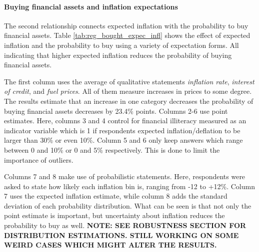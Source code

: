 \documentclass[ProjectABM]{subfiles}
\begin{document}



\paragraph{Buying financial assets and inflation expectations}
The second relationship connects expected inflation with the probability to buy financial assets. %
Table \ref{tab:reg_bought_expec_infl} shows the effect of expected inflation and the probability to buy using a variety of expectation forms. All indicating that higher expected inflation reduces the probability of buying financial assets.

The first column uses the average of qualitative statements \textit{inflation rate}, \textit{interest of credit}, and \textit{fuel prices}. All of them measure increases in prices to some degree. The results estimate that an increase in one category decreases the probability of buying financial assets decreases by 23.4\% points. Columns 2-6 use point estimates. Here, columns 3 and 4 control for financial illiteracy measured as an indicator variable which is 1 if respondents expected inflation/deflation to be larger than 30\% or even 10\%. Column 5 and 6 only keep answers which range between 0 and 10\% or 0 and 5\% respectively. This is done to limit the importance of outliers.

Columns 7 and 8 make use of probabilistic statements. Here, respondents were asked to state how likely each inflation bin is, ranging from -12 to +12\%. Column 7 uses the expected inflation estimate, while column 8 adds the standard deviation of each probability distribution. What can be seen is that not only the point estimate is important, but uncertainty about inflation reduces the probability to buy as well. \textbf{NOTE: SEE ROBUSTNESS SECTION FOR DISTRIBUTION ESTIMATIONS. STILL WORKING ON SOME WEIRD CASES WHICH MIGHT ALTER THE RESULTS.}
\end{document}
